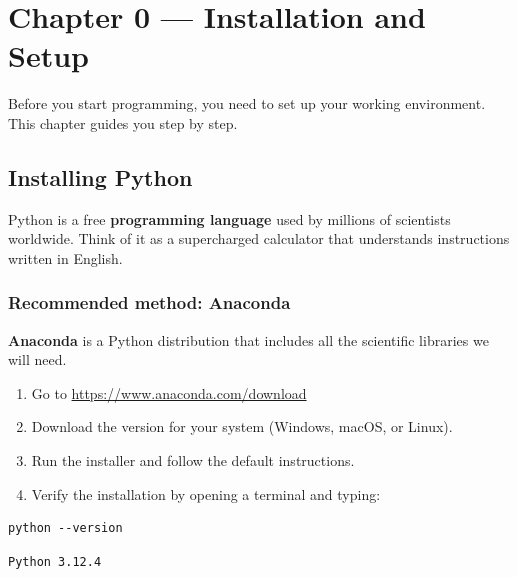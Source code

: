 \chapter*{Chapter 0 --- Installation and Setup}
\label{ch:installation}

Before you start programming, you need to set up your working environment. This chapter guides you step by step.

\section*{Installing Python}

\begin{intuition}
Python is a free \textbf{programming language} used by millions of scientists worldwide. Think of it as a supercharged calculator that understands instructions written in English.
\end{intuition}

\subsection*{Recommended method: Anaconda}

\textbf{Anaconda} is a Python distribution that includes all the scientific libraries we will need.

\begin{enumerate}
\item Go to \url{https://www.anaconda.com/download}
\item Download the version for your system (Windows, macOS, or Linux).
\item Run the installer and follow the default instructions.
\item Verify the installation by opening a terminal and typing:
\end{enumerate}

\begin{codeblock}[title=\textbf{Terminal}]
\begin{verbatim}
python --version
\end{verbatim}
\end{codeblock}

\begin{codeoutput}
\begin{verbatim}
Python 3.12.4
\end{verbatim}
\end{codeoutput}

